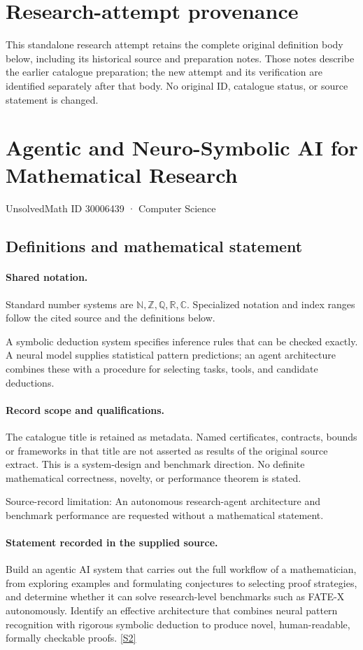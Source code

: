 \documentclass[11pt]{article}
\begin{document}
\section*{Research-attempt provenance}
This standalone research attempt retains the complete original definition body below,
including its historical source and preparation notes. Those notes describe the
earlier catalogue preparation; the new attempt and its verification are identified
separately after that body. No original ID, catalogue status, or source statement is changed.

\section{Agentic and Neuro-Symbolic AI for Mathematical Research}\label{30006439}
{\small UnsolvedMath ID 30006439 · Computer Science}
\subsection{Definitions and mathematical statement}

\paragraph{Shared notation.}Standard number systems are $\mathbb N,\mathbb Z,\mathbb Q,\mathbb R,\mathbb C$. Specialized notation and index ranges follow the cited source and the definitions below.


A symbolic deduction system specifies inference rules that can be checked exactly. A neural model supplies statistical pattern predictions; an agent architecture combines these with a procedure for selecting tasks, tools, and candidate deductions.
\paragraph{Record scope and qualifications.}
The catalogue title is retained as metadata. Named certificates, contracts, bounds or frameworks in that title are not asserted as results of the original source extract.
This is a system-design and benchmark direction. No definite mathematical correctness, novelty, or performance theorem is stated.

Source-record limitation: An autonomous research-agent architecture and benchmark performance are requested without a mathematical statement.
\paragraph{Statement recorded in the supplied source.}
Build an agentic AI system that carries out the full workflow of a mathematician, from exploring examples and formulating conjectures to selecting proof strategies, and determine whether it can solve research-level benchmarks such as FATE-X autonomously. Identify an effective architecture that combines neural pattern recognition with rigorous symbolic deduction to produce novel, human-readable, formally checkable proofs. \href{https://doi.org/10.4171/owr/2025/43}{[S2]}
\end{document}
